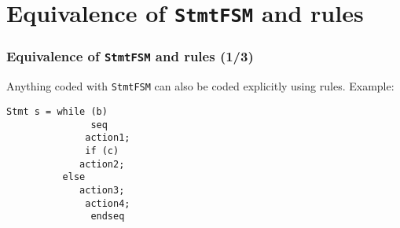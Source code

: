 
\section{Equivalence of {\tt StmtFSM} and rules}


\begin{frame}[fragile]
\frametitle{Equivalence of {\tt StmtFSM} and rules (1/3)}

\footnotesize

Anything coded with {\tt StmtFSM} can also be coded explicitly using rules.  Example:

\begin{Verbatim}[frame=single]
   Stmt s = while (b)
               seq
	          action1;
	          if (c)
		     action2;
		  else
		     action3;
	          action4;
               endseq
\end{Verbatim}

\end{frame}


